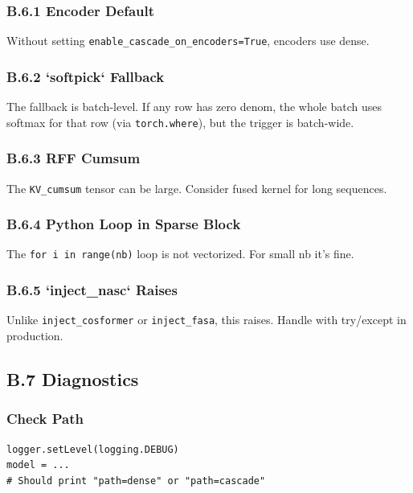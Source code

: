 \subsubsection{B.6.1 Encoder Default}

Without setting \texttt{enable\_cascade\_on\_encoders=True}, encoders use dense.

\subsubsection{B.6.2 `softpick` Fallback}

The fallback is batch-level. If any row has zero denom, the whole batch 
uses softmax for that row (via \texttt{torch.where}), but the trigger is 
batch-wide.

\subsubsection{B.6.3 RFF Cumsum}

The \texttt{KV\_cumsum} tensor can be large. Consider fused kernel for long 
sequences.

\subsubsection{B.6.4 Python Loop in Sparse Block}

The \texttt{for i in range(nb)} loop is not vectorized. For small nb it's fine.

\subsubsection{B.6.5 `inject\_nasc` Raises}

Unlike \texttt{inject\_cosformer} or \texttt{inject\_fasa}, this raises. Handle with 
try/except in production.

\subsection{B.7 Diagnostics}

\subsubsection{Check Path}

\begin{lstlisting}
logger.setLevel(logging.DEBUG)
model = ...
# Should print "path=dense" or "path=cascade"
\end{lstlisting}

